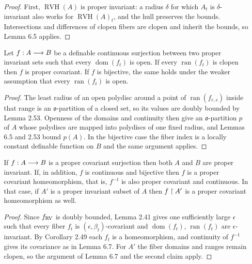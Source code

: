 \begin{proof}
\leanok
First, $\operatorname{RVH}(A)$ is proper invariant: a radius $\delta$ for which $A_t$ is $\delta$-invariant also works for $\operatorname{RVH}(A)_t$, and the hull preserves the bounds. Intersections and differences of clopen fibers are clopen and inherit the bounds, so Lemma 6.5 applies.
\end{proof}

\setcounter{theorem}{6}
\begin{lemma}
\label{conti-covar}
\leanok
{}
Let $f:A\longrightarrow B$ be a definable continuous surjection between two proper invariant sets such that every $\operatorname{dom}(f_t)$ is open. If every $\operatorname{ran}(f_t)$ is clopen then $f$ is proper covariant. If $f$ is bijective, the same holds under the weaker assumption that every $\operatorname{ran}(f_t)$ is open.
\end{lemma}

\begin{proof}
\leanok
The least radius of an open polydisc around a point of $\operatorname{ran}(f_{r,s})$ inside that range is an $\mathfrak{o}$-partition of a closed set, so its values are doubly bounded by Lemma 2.53. Openness of the domains and continuity then give an $\mathfrak{o}$-partition $p$ of $A$ whose polydiscs are mapped into polydiscs of one fixed radius, and Lemmas 6.5 and 2.53 bound $p(A)$. In the bijective case the fiber index is a locally constant definable function on $B$ and the same argument applies.
\end{proof}

\setcounter{theorem}{7}
\begin{lemma}
\label{conv-unif}
\leanok
{}
If $f:A\longrightarrow B$ is a proper covariant surjection then both $A$ and $B$ are proper invariant. If, in addition, $f$ is continuous and bijective then $f$ is a proper covariant homeomorphism, that is, $f^{-1}$ is also proper covariant and continuous. In that case, if $A'$ is a proper invariant subset of $A$ then $f\upharpoonright A'$ is a proper covariant homeomorphism as well.
\end{lemma}

\begin{proof}
\leanok
Since $f_{\mathrm{RV}}$ is doubly bounded, Lemma 2.41 gives one sufficiently large $\epsilon$ such that every fiber $f_t$ is $(\epsilon,\beta_t)$-covariant and $\operatorname{dom}(f_t)$, $\operatorname{ran}(f_t)$ are $\epsilon$-invariant. By Corollary 2.49 each $f_t$ is a homeomorphism, and continuity of $f^{-1}$ gives its covariance as in Lemma 6.7. For $A'$ the fiber domains and ranges remain clopen, so the argument of Lemma 6.7 and the second claim apply.
\end{proof}

